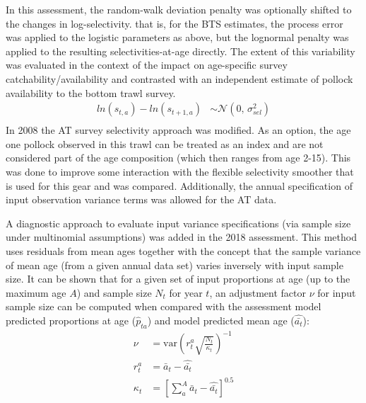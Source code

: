 \documentclass[11pt,
  english,
  a4paper,
]{article}
\begin{document}

In this assessment, the random-walk deviation penalty was optionally shifted to the changes in log-selectivity. that is, for the BTS estimates, the process error was applied to the logistic parameters as above, but the lognormal penalty was applied to the resulting selectivities-at-age directly. The extent of this variability was evaluated in the context of the impact on age-specific survey catchability/availability and contrasted with an independent estimate of pollock availability to the bottom trawl survey. \begin{align}
    {ln(s_{t,a})}  -  {ln(s_{t+1,a})}  &\sim \mathcal{N}(0,\,\sigma_{sel}^{2}) \\
\end{align} In 2008 the AT survey selectivity approach was modified. As an option, the age one pollock observed in this trawl can be treated as an index and are not considered part of the age composition (which then ranges from age 2-15). This was done to improve some interaction with the flexible selectivity smoother that is used for this gear and was compared. Additionally, the annual specification of input observation variance terms was allowed for the AT data.

\leavevmode\tagmcend\tagstructend\par


A diagnostic approach to evaluate input variance specifications (via sample size under multinomial assumptions) was added in the 2018 assessment. This method uses residuals from mean ages together with the concept that the sample variance of mean age (from a given annual data set) varies inversely with input sample size. It can be shown that for a given set of input proportions at age (up to the maximum age {\(A\)\leavevmode\tagmcend\tagstructend}) and sample size {\(N_t\)\leavevmode\tagmcend\tagstructend} for year {\(t\)\leavevmode\tagmcend\tagstructend}, an adjustment factor {\(\nu\)\leavevmode\tagmcend\tagstructend} for input sample size can be computed when compared with the assessment model predicted proportions at age ({\(\hat p_{ta}\)\leavevmode\tagmcend\tagstructend}) and model predicted mean age ({\(\hat{\bar{a_t}}\)\leavevmode\tagmcend\tagstructend}): \begin{align}
\nu   &= \text{var}\left( r^a_t \sqrt{\frac{N_t}{\kappa_t} }\right)^{-1} \\
r^a_t &= \bar a_t - \hat{\bar{a_t}}                                      \\
\kappa_t &= \left[ \sum_a^A {\bar a_t - \hat{\bar{a_t}}} \right]^{0.5}
\end{align}
\end{document}

